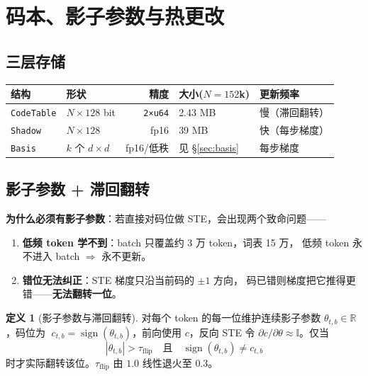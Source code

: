 \documentclass[11pt,a4paper]{ctexart}
\newcommand{\keybox}[1]{%
  \begin{center}\begin{minipage}{0.94\textwidth}%
  \colorbox{graylight}{\begin{minipage}{0.92\textwidth}\vspace{3pt}#1\vspace{3pt}\end{minipage}}%
  \end{minipage}\end{center}}
\theoremstyle{definition}
\newtheorem{definition}{定义}
\begin{document}
\section{码本、影子参数与热更改}\label{sec:codebook}

\subsection{三层存储}

\begin{center}
\begin{tabularx}{\textwidth}{@{}llrlX@{}}
\toprule
\textbf{结构} & \textbf{形状} & \textbf{精度} & \textbf{大小}($N{=}152$k) & \textbf{更新频率} \\
\midrule
\texttt{CodeTable} & $N\times128$ bit & \texttt{2×u64} & 2.43 MB & 慢（滞回翻转） \\
\texttt{Shadow} & $N\times128$ & fp16 & 39 MB & 快（每步梯度） \\
\texttt{Basis} & $k$ 个 $d\times d$ & fp16/低秩 & 见 \S\ref{sec:basis} & 每步梯度 \\
\bottomrule
\end{tabularx}
\end{center}

\subsection{影子参数 + 滞回翻转}

\keybox{%
\textbf{为什么必须有影子参数}：若直接对码位做 STE，会出现两个致命问题——
\begin{enumerate}
\item \textbf{低频 token 学不到}：batch 只覆盖约 3 万 token，词表 15 万，
      低频 token 永不进入 batch $\Rightarrow$ 永不更新。
\item \textbf{错位无法纠正}：STE 梯度只沿当前码的 $\pm1$ 方向，
      码已错则梯度把它推得更错——\textbf{无法翻转一位}。
\end{enumerate}}

\begin{definition}[影子参数与滞回翻转]
对每个 token 的每一位维护连续影子参数 $\theta_{t,b}\in\mathbb{R}$，码位为
$\;c_{t,b}=\operatorname{sign}(\theta_{t,b})$，前向使用 $c$，反向 STE 令
$\partial c/\partial\theta\approx\mathbb{I}$。仅当
\begin{equation}
|\theta_{t,b}|>\tau_{\text{flip}} \quad\text{且}\quad \operatorname{sign}(\theta_{t,b})\ne c_{t,b}
\end{equation}
时才实际翻转该位。$\tau_{\text{flip}}$ 由 $1.0$ 线性退火至 $0.3$。
\end{definition}
\end{document}
